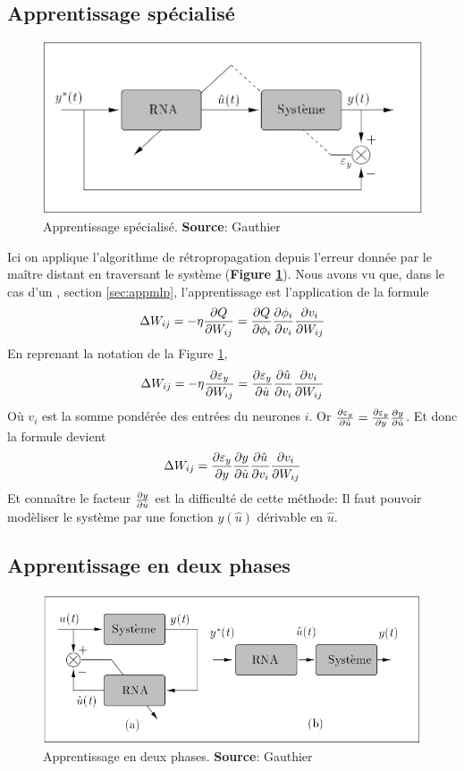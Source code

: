 \subsection{Apprentissage spécialisé}\label{sec:appspecial}
\begin{figure}
 \centering
 \includegraphics[scale=0.4]{../figures/appspecialise.jpg}
 \caption{Apprentissage spécialisé. \textbf{Source}: Gauthier\cite{Gauthier}}
 \label{appspecialise}
\end{figure}
Ici on applique l'algorithme de rétropropagation depuis l'erreur donnée par le maître distant en traversant le système (\textbf{Figure \ref{appspecialise}}).
Nous avons vu que, dans le cas d'un \mlp, section \ref{sec:appmlp}, l'apprentissage est l'application de la formule \[\Delta W_{ij} = -\eta\frac{\partial Q}{\partial W_{ij}} = \frac{\partial Q}{\partial \phi_i} \frac{\partial \phi_i}{\partial v_i} \frac{\partial v_i}{\partial W_{ij}}\]
En reprenant la notation de la Figure \ref{appspecialise}, \[\Delta W_{ij} = -\eta\frac{\partial \varepsilon_y}{\partial W_{ij}} = \frac{\partial \varepsilon_y}{\partial \hat{u}} \frac{\partial \hat{u}}{\partial v_i} \frac{\partial v_i}{\partial W_{ij}}\]
Où $v_i$ est la somme pondérée des entrées du neurones $i$.
Or $\frac{\partial \varepsilon_y}{\partial \hat{u}} = \frac{\partial \varepsilon_y}{\partial y}\frac{\partial y}{\partial \hat{u}}$. Et donc la formule devient
\[\Delta W_{ij} = \frac{\partial \varepsilon_y}{\partial y} \frac{\partial y}{\partial \hat{u}} \frac{\partial \hat{u}}{\partial v_i} \frac{\partial v_i}{\partial W_{ij}}\]
Et connaître le facteur $\frac{\partial y}{\partial \hat{u}}$ est la difficulté de cette méthode:
Il faut pouvoir modèliser le système par une fonction $y(\hat{u})$ dérivable en $\hat{u}$.

\subsection{Apprentissage en deux phases}\label{sec:app2phases}
\begin{figure}
 \centering
 \includegraphics[scale=0.5]{../figures/app2phases.jpg}
 \caption{Apprentissage en deux phases. \textbf{Source}: Gauthier\cite{Gauthier}}
 \label{app2phases}
\end{figure}

